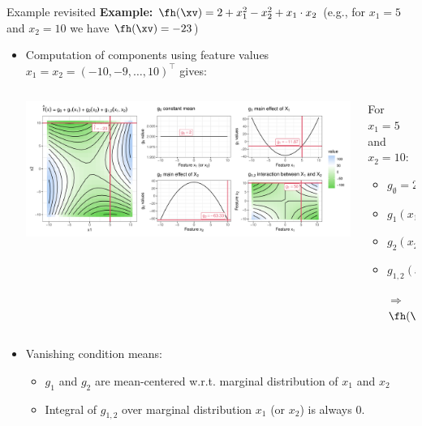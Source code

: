 \documentclass[11pt,compress,t,notes=noshow, aspectratio=169, xcolor=table]{beamer}
\newcommand{\open}{}
\newcommand{\close}{}
\begin{document}
\begin{frame}{Example revisited}
\textbf{Example:} $\fh(\xv) = 2 + x_1^2 - x_2^2 + x_1 \cdot x_2$ (e.g., for $x_1 = 5$ and $x_2 = 10$ we have $\fh(\xv) = -23$)

\begin{itemize}
    \item Computation of components using feature values $x_1 = x_2 = (-10, -9, \ldots, 10)^\top$ gives:
    \begin{columns}[c, totalwidth=\linewidth]
    \begin{column}{0.75\textwidth}
        \includegraphics[width = \textwidth]{figure/decomposition}
    \end{column}
    \begin{column}{0.25\textwidth}
    For $x_1 = 5$ and $x_2 = 10$:\\
    \begin{itemize}
        \item $g_{\open \emptyset \close} = 2$
        \item $g_{\open 1 \close}(x_1) = -9.67$
        \item $g_{\open 2 \close}(x_2) = -65.33$
        \item $g_{\open 1,2 \close}(x_1, x_2) = 50$
        \item[$\Rightarrow$] $\fh(\xv) = -23$
    \end{itemize}
    \end{column}
    \end{columns}
    \item Vanishing condition means:
    \begin{itemize}
        \item $g_1$ and $g_2$ are mean-centered w.r.t. marginal distribution of $x_1$ and $x_2$
        \item Integral of $g_{1,2}$ over marginal distribution $x_1$ (or $x_2$) is always 0.
    \end{itemize}
\end{itemize} 
\end{frame}
\end{document}
